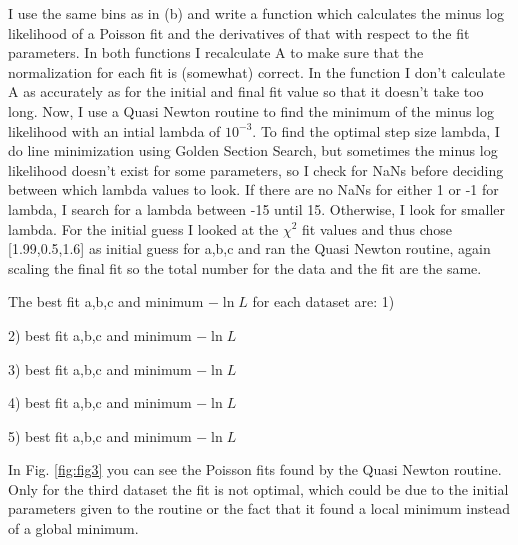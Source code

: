 I use the same bins as in (b) and write a function which calculates the minus log likelihood of a Poisson fit and the derivatives of that with respect to the fit parameters. In both functions I recalculate A to make sure that the normalization for each fit is (somewhat) correct. In the function I don't calculate A as accurately as for the initial and final fit value so that it doesn't take too long. 
Now, I use a Quasi Newton routine to find the minimum of the minus log likelihood with an intial lambda of $10^{-3}$. To find the optimal step size lambda, I do line minimization using Golden Section Search, but sometimes the minus log likelihood doesn't exist for some parameters, so I check for NaNs before deciding between which lambda values to look. If there are no NaNs for either 1 or -1 for lambda, I search for a lambda between -15 until 15. Otherwise, I look for smaller lambda. 
For the initial guess I looked at the $\chi^2$ fit values and thus chose [1.99,0.5,1.6] as initial guess for a,b,c and ran the Quasi Newton routine, again scaling the final fit so the total number for the data and the fit are the same.

The best fit a,b,c and minimum $-\ln L$ for each dataset are: 
1)

2) best fit a,b,c and minimum $-\ln L$

3) best fit a,b,c and minimum $-\ln L$

4) best fit a,b,c and minimum $-\ln L$

5) best fit a,b,c and minimum $-\ln L$



In Fig. \ref{fig:fig3} you can see the Poisson fits found by the Quasi Newton routine. Only for the third dataset the fit is not optimal, which could be due to the initial parameters given to the routine or the fact that it found a local minimum instead of a global minimum. 

